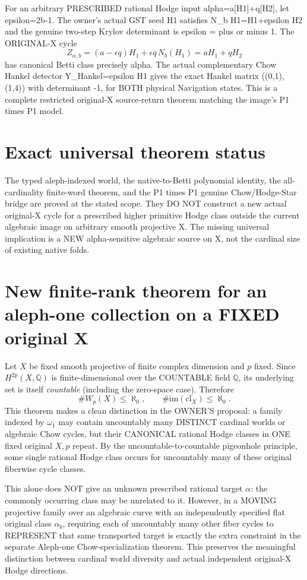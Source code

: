 \documentclass[11pt]{article}
\begin{document}
For an arbitrary PRESCRIBED rational Hodge input
alpha=a[H1]+q[H2], let epsilon=2b-1.
The owner's actual GST seed H1 satisfies
N_b H1=H1+epsilon H2 and the genuine two-step
Krylov determinant is epsilon = plus or minus 1.
The ORIGINAL-X cycle
\[
\boxed{
Z_{\alpha,b}
=(a-\epsilon q)H_1+\epsilon q\,N_b(H_1)
=aH_1+qH_2
}
\]
has canonical Betti class precisely alpha.
The actual complementary Chow Hankel detector
Y_Hankel=epsilon H1 gives
the exact Hankel matrix ((0,1),(1,4))
with determinant -1, for BOTH physical
Navigation states. This is a complete
restricted original-X source-return theorem
matching the image's P1 times P1 model.

\section{Exact universal theorem status}
The typed aleph-indexed world,
the native-to-Betti polynomial identity,
the all-cardinality finite-word theorem,
and the P1 times P1 genuine Chow/Hodge-Star bridge
are proved at the stated scope. They DO NOT
construct a new actual original-X cycle for
a prescribed higher primitive Hodge class
outside the current algebraic image on
arbitrary smooth projective X.
The missing universal implication is a
NEW alpha-sensitive algebraic source on X,
not the cardinal size of existing native folds.


\section{New finite-rank theorem for an aleph-one collection on a FIXED original X}

Let \(X\) be fixed smooth projective of finite complex dimension
and \(p\) fixed. Since \(H^{2p}(X,\mathbb Q)\)
is finite-dimensional over the COUNTABLE field
\(\mathbb Q\), its underlying set is itself
\emph{countable} (including the zero-space case).
Therefore
\[
\boxed{\#W_p(X)\le\aleph_0,\qquad
\#\mathrm{im}(\mathrm{cl}_X)\le\aleph_0.}
\]
This theorem makes a clean distinction in the
OWNER'S proposal: a family indexed by
\(\omega_1\) may contain uncountably many
DISTINCT cardinal worlds or algebraic Chow
cycles, but their CANONICAL rational Hodge
classes in ONE fixed original \(X,p\) repeat.
By the uncountable-to-countable pigeonhole
principle, some single rational Hodge class
occurs for uncountably many of these original
fiberwise cycle classes.

This alone does NOT give an unknown prescribed
rational target \(\alpha\): the commonly occurring
class may be unrelated to it.
However, in a MOVING projective family over
an algebraic curve with an independently
specified flat original class \(\alpha_b\),
requiring each of uncountably many other
fiber cycles to REPRESENT that same
transported target is exactly the
extra constraint in the separate
Aleph-one Chow-specialization theorem.
This preserves the meaningful distinction
between cardinal world diversity and
actual independent original-X Hodge directions.
\end{document}
